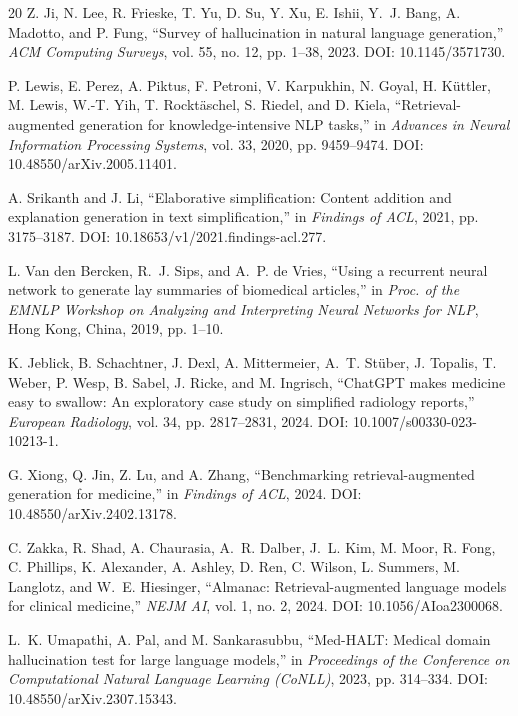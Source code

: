 \documentclass[conference]{IEEEtran}
\begin{document}
\begin{thebibliography}{20}
Z. Ji, N. Lee, R. Frieske, T. Yu, D. Su, Y. Xu, E. Ishii, Y.~J. Bang, A. Madotto, and P. Fung, ``Survey of hallucination in natural language generation,'' \textit{ACM Computing Surveys}, vol. 55, no. 12, pp. 1--38, 2023. DOI: 10.1145/3571730.

P. Lewis, E. Perez, A. Piktus, F. Petroni, V. Karpukhin, N. Goyal, H. Küttler, M. Lewis, W.-T. Yih, T. Rocktäschel, S. Riedel, and D. Kiela, ``Retrieval-augmented generation for knowledge-intensive NLP tasks,'' in \textit{Advances in Neural Information Processing Systems}, vol. 33, 2020, pp. 9459--9474. DOI: 10.48550/arXiv.2005.11401.

A. Srikanth and J. Li, ``Elaborative simplification: Content addition and explanation generation in text simplification,'' in \textit{Findings of ACL}, 2021, pp. 3175--3187. DOI: 10.18653/v1/2021.findings-acl.277.

L. Van den Bercken, R.~J. Sips, and A.~P. de Vries, ``Using a recurrent neural network to generate lay summaries of biomedical articles,'' in \textit{Proc. of the EMNLP Workshop on Analyzing and Interpreting Neural Networks for NLP}, Hong Kong, China, 2019, pp. 1--10.

K. Jeblick, B. Schachtner, J. Dexl, A. Mittermeier, A.~T. Stüber, J. Topalis, T. Weber, P. Wesp, B. Sabel, J. Ricke, and M. Ingrisch, ``ChatGPT makes medicine easy to swallow: An exploratory case study on simplified radiology reports,'' \textit{European Radiology}, vol. 34, pp. 2817--2831, 2024. DOI: 10.1007/s00330-023-10213-1.

G. Xiong, Q. Jin, Z. Lu, and A. Zhang, ``Benchmarking retrieval-augmented generation for medicine,'' in \textit{Findings of ACL}, 2024. DOI: 10.48550/arXiv.2402.13178.

C. Zakka, R. Shad, A. Chaurasia, A.~R. Dalber, J.~L. Kim, M. Moor, R. Fong, C. Phillips, K. Alexander, A. Ashley, D. Ren, C. Wilson, L. Summers, M. Langlotz, and W.~E. Hiesinger, ``Almanac: Retrieval-augmented language models for clinical medicine,'' \textit{NEJM AI}, vol. 1, no. 2, 2024. DOI: 10.1056/AIoa2300068.

L.~K. Umapathi, A. Pal, and M. Sankarasubbu, ``Med-HALT: Medical domain hallucination test for large language models,'' in \textit{Proceedings of the Conference on Computational Natural Language Learning (CoNLL)}, 2023, pp. 314--334. DOI: 10.48550/arXiv.2307.15343.


\end{thebibliography}
\end{document}
